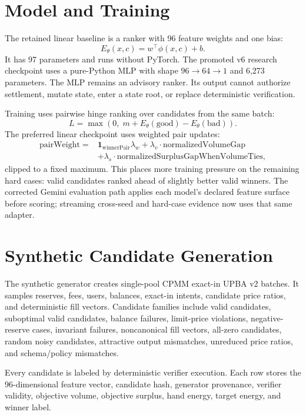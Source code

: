 \documentclass[11pt]{article}
\begin{document}
\section{Model and Training}

The retained linear baseline is a ranker with 96 feature weights and one bias:
\[
  E_\theta(x,c) = w^\top \phi(x,c) + b.
\]
It has 97 parameters and runs without PyTorch. The promoted v6 research
checkpoint uses a pure-Python MLP with shape
$96 \rightarrow 64 \rightarrow 1$ and 6,273 parameters. The MLP remains an
advisory ranker. Its output cannot authorize settlement, mutate state, enter a
state root, or replace deterministic verification.

Training uses pairwise hinge ranking over candidates from the same batch:
\[
  L = \max(0,\; m + E_\theta(\mathrm{good}) - E_\theta(\mathrm{bad})).
\]
The preferred linear checkpoint uses weighted pair updates:
\[
\begin{aligned}
  \mathrm{pairWeight} ={}& \mathbf{1}_{\mathrm{winnerPair}}\lambda_w
  + \lambda_v \cdot \mathrm{normalizedVolumeGap} \\
  &+ \lambda_s \cdot \mathrm{normalizedSurplusGapWhenVolumeTies},
\end{aligned}
\]
clipped to a fixed maximum. This places more training pressure on the remaining
hard cases: valid candidates ranked ahead of slightly better valid winners.
The corrected Gemini evaluation path applies each model's declared feature
surface before scoring; streaming cross-seed and hard-case evidence now uses
that same adapter.

\section{Synthetic Candidate Generation}

The synthetic generator creates single-pool CPMM exact-in UPBA v2 batches. It
samples reserves, fees, users, balances, exact-in intents, candidate price
ratios, and deterministic fill vectors. Candidate families include valid
candidates, suboptimal valid candidates, balance failures, limit-price
violations, negative-reserve cases, invariant failures, noncanonical fill
vectors, all-zero candidates, random noisy candidates, attractive output
mismatches, unreduced price ratios, and schema/policy mismatches.

Every candidate is labeled by deterministic verifier execution. Each row stores
the 96-dimensional feature vector, candidate hash, generator provenance,
verifier validity, objective volume, objective surplus, hand energy, target
energy, and winner label.
\end{document}

